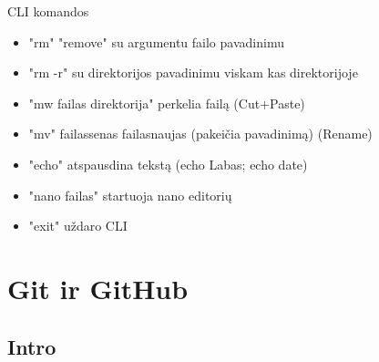 \documentclass[11pt,xcolor=table]{beamer}
\begin{document}
\begin{frame}{CLI komandos}
\begin{itemize}
\item "rm" "remove" su argumentu failo pavadinimu
\item "rm -r" su direktorijos pavadinimu viskam kas direktorijoje
\item "mw failas direktorija" perkelia failą (Cut+Paste)
\item "mv" failassenas failasnaujas (pakeičia pavadinimą) (Rename)
\item "echo" atspausdina tekstą (echo Labas; echo date)
\item "nano failas" startuoja nano editorių 
\item "exit" uždaro CLI 
\end{itemize}
\end{frame}

\section{Git ir GitHub}

\subsection{Intro}
\end{document}
